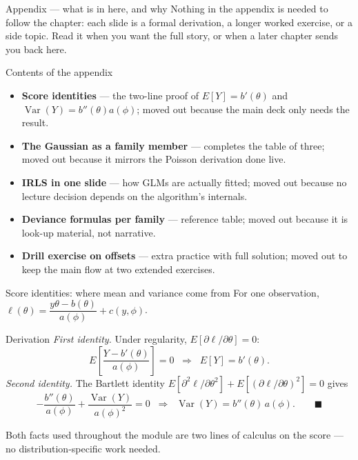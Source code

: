 \documentclass[aspectratio=169,11pt]{beamer}
\begin{document}
\begin{frame}{Appendix --- what is in here, and why}
  Nothing in the appendix is needed to follow the chapter: each slide is a formal
  derivation, a longer worked exercise, or a side topic. Read it when you want the
  full story, or when a later chapter sends you back here.
  \begin{block}{Contents of the appendix}
    \begin{itemize}
      \item \textbf{Score identities} --- the two-line proof of $E[Y]=b'(\theta)$ and
            $\operatorname{Var}(Y)=b''(\theta)a(\phi)$; moved out because the main deck
            only needs the result.
      \item \textbf{The Gaussian as a family member} --- completes the table of three;
            moved out because it mirrors the Poisson derivation done live.
      \item \textbf{IRLS in one slide} --- how GLMs are actually fitted; moved out
            because no lecture decision depends on the algorithm's internals.
      \item \textbf{Deviance formulas per family} --- reference table; moved out
            because it is look-up material, not narrative.
      \item \textbf{Drill exercise on offsets} --- extra practice with full solution;
            moved out to keep the main flow at two extended exercises.
    \end{itemize}
  \end{block}
\end{frame}

\begin{frame}{Score identities: where mean and variance come from}
  \footnotesize
  For one observation, $\ell(\theta) = \dfrac{y\theta - b(\theta)}{a(\phi)} + c(y,\phi)$.
  \begin{block}{Derivation}
    \emph{First identity.} Under regularity, $E\!\left[\partial\ell/\partial\theta\right] = 0$:
    \[
      E\!\left[\frac{Y - b'(\theta)}{a(\phi)}\right] = 0
      \;\;\Longrightarrow\;\; E[Y] = b'(\theta).
    \]
    \emph{Second identity.} The Bartlett identity
    $E\!\left[\partial^2\ell/\partial\theta^2\right]
     + E\!\left[(\partial\ell/\partial\theta)^2\right] = 0$ gives
    \[
      -\frac{b''(\theta)}{a(\phi)} + \frac{\operatorname{Var}(Y)}{a(\phi)^2} = 0
      \;\;\Longrightarrow\;\; \operatorname{Var}(Y) = b''(\theta)\,a(\phi). \qquad\blacksquare
    \]
  \end{block}
  \begin{takeaway}
    Both facts used throughout the module are two lines of calculus on the score ---
    no distribution-specific work needed.
  \end{takeaway}
\end{frame}
\end{document}
